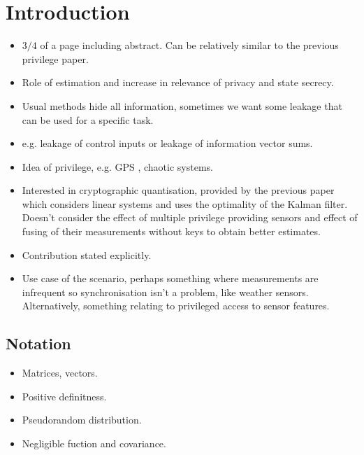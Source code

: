 \documentclass[conference]{IEEEtran}
\begin{document}
\section{Introduction}
\begin{itemize}
  \item $3/4$ of a page including abstract. Can be relatively similar to the previous privilege paper.
  \item Role of estimation and increase in relevance of privacy and state secrecy.
  \item Usual methods hide all information, sometimes we want some leakage that can be used for a specific task.
  \item e.g. leakage of control inputs or leakage of information vector sums.
  \item Idea of privilege, e.g. GPS \cite{grovesPrinciplesGNSSInertial2015}, chaotic systems.
  \item Interested in cryptographic quantisation, provided by the previous paper which considers linear systems and uses the optimality of the Kalman filter. Doesn't consider the effect of multiple privilege providing sensors and effect of fusing of their measurements without keys to obtain better estimates. 
  \item Contribution stated explicitly.
  \item Use case of the scenario, perhaps something where measurements are infrequent so synchronisation isn't a problem, like weather sensors. Alternatively, something relating to privileged access to sensor features.
\end{itemize}

\subsection{Notation}
\begin{itemize}
  \item Matrices, vectors.
  \item Positive definitness.
  \item Pseudorandom distribution.
  \item Negligible fuction and covariance.
\end{itemize}
\end{document}
